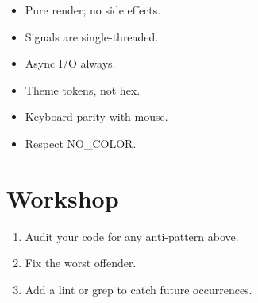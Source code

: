 \begin{recap}
\begin{itemize}[leftmargin=*]
  \item Pure render; no side effects.
  \item Signals are single-threaded.
  \item Async I/O always.
  \item Theme tokens, not hex.
  \item Keyboard parity with mouse.
  \item Respect NO\_COLOR.
\end{itemize}
\end{recap}

\section*{Workshop}

\begin{enumerate}[leftmargin=*]
  \item Audit your code for any anti-pattern above.
  \item Fix the worst offender.
  \item Add a lint or grep to catch future occurrences.
\end{enumerate}

